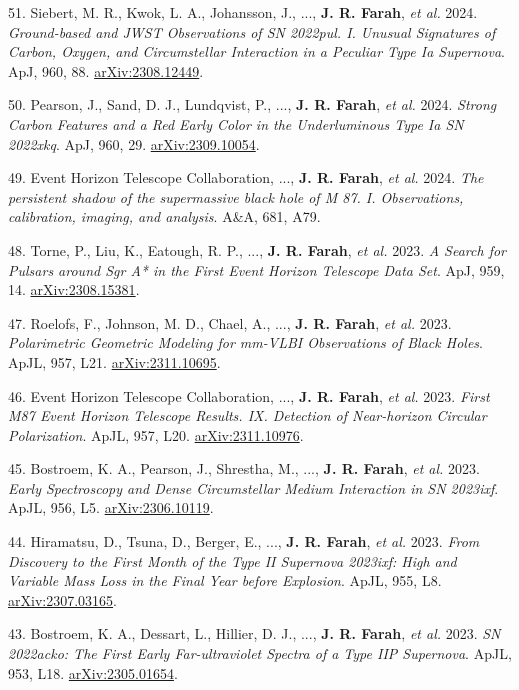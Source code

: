 \documentclass[margin,line]{res}
\newcommand{\apj}{ApJ}                    %
\newcommand{\apjl}{ApJL}                  %
\newcommand{\aap}{A\&A}                   %
\begin{document}
\begin{resume}
51. Siebert, M. R., Kwok, L. A., Johansson, J., ..., \textbf{J. R. Farah}, \textit{et al.} 2024. \textit{Ground-based and JWST Observations of SN 2022pul. I. Unusual Signatures of Carbon, Oxygen, and Circumstellar Interaction in a Peculiar Type Ia Supernova}. \apj, 960, 88. \href{https://arxiv.org/abs/2308.12449}{arXiv:2308.12449}.

50. Pearson, J., Sand, D. J., Lundqvist, P., ..., \textbf{J. R. Farah}, \textit{et al.} 2024. \textit{Strong Carbon Features and a Red Early Color in the Underluminous Type Ia SN 2022xkq}. \apj, 960, 29. \href{https://arxiv.org/abs/2309.10054}{arXiv:2309.10054}.

49. Event Horizon Telescope Collaboration, ..., \textbf{J. R. Farah}, \textit{et al.} 2024. \textit{The persistent shadow of the supermassive black hole of M 87. I. Observations, calibration, imaging, and analysis}. \aap, 681, A79.

48. Torne, P., Liu, K., Eatough, R. P., ..., \textbf{J. R. Farah}, \textit{et al.} 2023. \textit{A Search for Pulsars around Sgr A* in the First Event Horizon Telescope Data Set}. \apj, 959, 14. \href{https://arxiv.org/abs/2308.15381}{arXiv:2308.15381}.

47. Roelofs, F., Johnson, M. D., Chael, A., ..., \textbf{J. R. Farah}, \textit{et al.} 2023. \textit{Polarimetric Geometric Modeling for mm-VLBI Observations of Black Holes}. \apjl, 957, L21. \href{https://arxiv.org/abs/2311.10695}{arXiv:2311.10695}.

46. Event Horizon Telescope Collaboration, ..., \textbf{J. R. Farah}, \textit{et al.} 2023. \textit{First M87 Event Horizon Telescope Results. IX. Detection of Near-horizon Circular Polarization}. \apjl, 957, L20. \href{https://arxiv.org/abs/2311.10976}{arXiv:2311.10976}.

45. Bostroem, K. A., Pearson, J., Shrestha, M., ..., \textbf{J. R. Farah}, \textit{et al.} 2023. \textit{Early Spectroscopy and Dense Circumstellar Medium Interaction in SN 2023ixf}. \apjl, 956, L5. \href{https://arxiv.org/abs/2306.10119}{arXiv:2306.10119}.

44. Hiramatsu, D., Tsuna, D., Berger, E., ..., \textbf{J. R. Farah}, \textit{et al.} 2023. \textit{From Discovery to the First Month of the Type II Supernova 2023ixf: High and Variable Mass Loss in the Final Year before Explosion}. \apjl, 955, L8. \href{https://arxiv.org/abs/2307.03165}{arXiv:2307.03165}.

43. Bostroem, K. A., Dessart, L., Hillier, D. J., ..., \textbf{J. R. Farah}, \textit{et al.} 2023. \textit{SN 2022acko: The First Early Far-ultraviolet Spectra of a Type IIP Supernova}. \apjl, 953, L18. \href{https://arxiv.org/abs/2305.01654}{arXiv:2305.01654}.


\end{resume}
\end{document}
